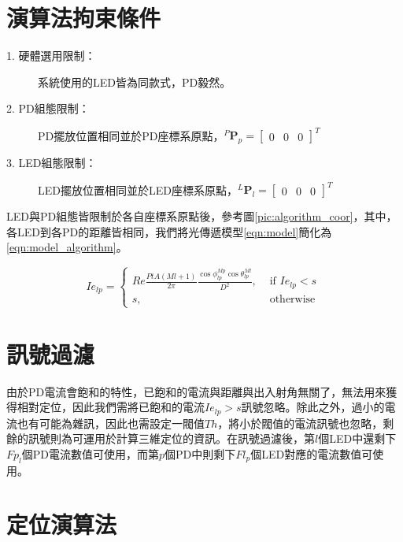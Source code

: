 \section{演算法拘束條件}
\label{chp:algorithm_constraint}

    \begin{description}

        \item[1. 硬體選用限制：]系統使用的LED皆為同款式，PD毅然。
        \item[2. PD組態限制：]PD擺放位置相同並於PD座標系原點，$^P\boldsymbol{P}_p=
        \left[\begin{array}{ccc}0&0&0\end{array}\right]^T$
        \item[3. LED組態限制：]LED擺放位置相同並於LED座標系原點，$^L\boldsymbol{P}_l=
        \left[\begin{array}{ccc}0&0&0\end{array}\right]^T$

    \end{description}
   
    

    LED與PD組態皆限制於各自座標系原點後，參考圖\ref{pic:algorithm_coor}，其中，各LED到各PD的距離皆相同，我們將光傳遞模型\ref{eqn:model}簡化為\ref{eqn:model_algorithm}。

    \begin{equation}
        \label{eqn:model_algorithm}
        Ie_{lp} = \begin{cases}Re\frac{PtA(Ml+1)}{2\pi}\frac{\cos\phi_{lp}^{Mp}\cos \theta_{lp}^{Ml}}{D^2} , & \text { if } Ie_{lp}<s \\ s, & \text { otherwise }\end{cases}
    \end{equation}


\section{訊號過濾}
\label{chp:algorithm_filter}

由於PD電流會飽和的特性，已飽和的電流與距離與出入射角無關了，無法用來獲得相對定位，因此我們需將已飽和的電流$Ie_{lp}>s$訊號忽略。除此之外，過小的電流也有可能為雜訊，因此也需設定一閥值$Th$，將小於閥值的電流訊號也忽略，剩餘的訊號則為可運用於計算三維定位的資訊。在訊號過濾後，第$l$個LED中還剩下$Fp_l$個PD電流數值可使用，而第$p$個PD中則剩下$Fl_p$個LED對應的電流數值可使用。



\section{定位演算法}
\label{chp:algorithm}


